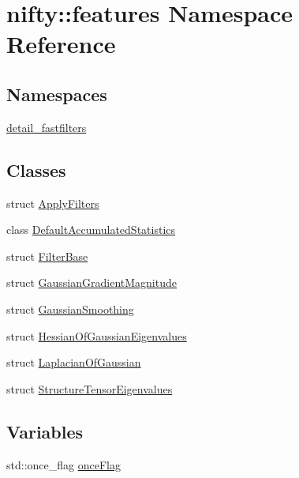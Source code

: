 \hypertarget{namespacenifty_1_1features}{}\section{nifty\+:\+:features Namespace Reference}
\label{namespacenifty_1_1features}
\subsection*{Namespaces}
\begin{DoxyCompactItemize}
\item 
 \hyperlink{namespacenifty_1_1features_1_1detail__fastfilters}{detail\+\_\+fastfilters}
\end{DoxyCompactItemize}
\subsection*{Classes}
\begin{DoxyCompactItemize}
\item 
struct \hyperlink{structnifty_1_1features_1_1ApplyFilters}{Apply\+Filters}
\item 
class \hyperlink{classnifty_1_1features_1_1DefaultAccumulatedStatistics}{Default\+Accumulated\+Statistics}
\item 
struct \hyperlink{structnifty_1_1features_1_1FilterBase}{Filter\+Base}
\item 
struct \hyperlink{structnifty_1_1features_1_1GaussianGradientMagnitude}{Gaussian\+Gradient\+Magnitude}
\item 
struct \hyperlink{structnifty_1_1features_1_1GaussianSmoothing}{Gaussian\+Smoothing}
\item 
struct \hyperlink{structnifty_1_1features_1_1HessianOfGaussianEigenvalues}{Hessian\+Of\+Gaussian\+Eigenvalues}
\item 
struct \hyperlink{structnifty_1_1features_1_1LaplacianOfGaussian}{Laplacian\+Of\+Gaussian}
\item 
struct \hyperlink{structnifty_1_1features_1_1StructureTensorEigenvalues}{Structure\+Tensor\+Eigenvalues}
\end{DoxyCompactItemize}
\subsection*{Variables}
\begin{DoxyCompactItemize}
\item 
std\+::once\+\_\+flag \hyperlink{namespacenifty_1_1features_af5770cdfb4d70324029cf0f8a7061e69}{once\+Flag}
\end{DoxyCompactItemize}


